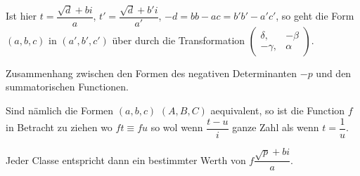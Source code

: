 \begin{itshape}
Ist hier $t=\dfrac{\surd d+bi}{a}$, $t'=\dfrac{\surd d+b'i}{a'}$,
$-d=bb-ac=b'b'-a'c'$, so geht die Form $(a,\allowbreak b,\allowbreak c)$ in $(a',\allowbreak b',\allowbreak c')$ über durch die Transformation
$\left(\begin{smallmatrix}\delta,\allowbreak &-\beta\\-\gamma,\allowbreak &\alpha\end{smallmatrix}\right)$.

Zusammenhang zwischen den Formen des negativen Determinanten $-p$ und
den summatorischen Functionen.

Sind nämlich die Formen $(a,\allowbreak b,\allowbreak c)$ $(A,\allowbreak B,\allowbreak C)$ aequivalent, so ist die Function $f$
in Betracht zu ziehen wo $ft\equiv fu$ so wol wenn $\dfrac{t-u}{i}$ ganze Zahl als wenn
$t=\dfrac1u$.
\par
Jeder Classe entspricht dann ein bestimmter Werth von $f\dfrac{\surd p+bi}{a}$.
\end{itshape}


